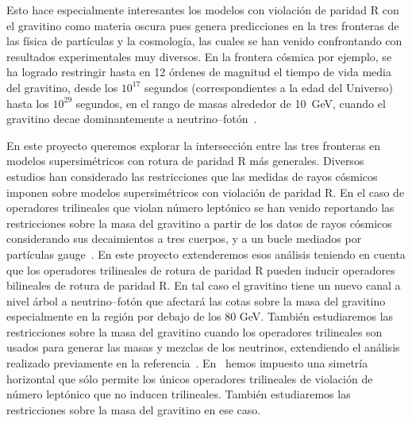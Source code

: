 Esto hace especialmente interesantes los modelos con violación de
paridad R con el gravitino como materia oscura pues genera
predicciones en la tres fronteras de las física de partículas y la
cosmología, las cuales se han venido confrontando con resultados
experimentales muy diversos. En la frontera cósmica por ejemplo, se ha
logrado restringir hasta en 12 órdenes de magnitud el tiempo de vida
media del gravitino, desde los $10^{17}$ segundos (correspondientes a
la edad del Universo) hasta los $10^{29}$ segundos, en el rango de
masas alrededor de 10~GeV, cuando el gravitino decae dominantemente a
neutrino--fotón~\cite{Vertongen:2011mu}.

\begin{gravitinodm}
  En este proyecto queremos explorar la intersección entre las tres
  fronteras en modelos supersimétricos con rotura de paridad R más
  generales.  Diversos estudios han considerado las restricciones que
  las medidas de rayos cósmicos imponen sobre modelos supersimétricos
  con violación de paridad R. En el caso de operadores trilineales que
  violan número leptónico se han venido reportando las restricciones
  sobre la masa del gravitino a partir de los datos de rayos cósmicos
  considerando sus decaimientos a tres cuerpos, y a un bucle mediados
  por partículas
  gauge~\cite{Lola:2007rw,Lola:2008bk,Bomark:2009zm}. En este proyecto
  extenderemos esos análisis teniendo en cuenta que los operadores
  trilineales de rotura de paridad R pueden inducir operadores
  bilineales de rotura de paridad R. En tal caso el gravitino tiene un
  nuevo canal a nivel árbol a neutrino--fotón que afectará las cotas
  sobre la masa del gravitino especialmente en la región por debajo de
  los 80 GeV. También estudiaremos las restricciones sobre la masa del
  gravitino cuando los operadores trilineales son usados para generar
  las masas y mezclas de los neutrinos, extendiendo el análisis
  realizado previamente en la
  referencia~\cite{Bajc:2010qj}. En~\cite{Sierra:2009zq} hemos
  impuesto una simetría horizontal que sólo permite los únicos
  operadores trilineales de violación de número leptónico que no
  inducen trilineales. También estudiaremos las restricciones sobre la
  masa del gravitino en ese caso.

\end{gravitinodm}

